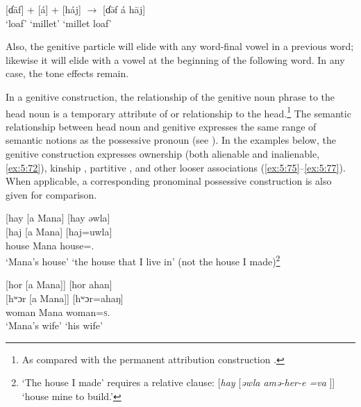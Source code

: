 \ea \label{ex:5:71}
\textup{[ɗ\={a}f]  +  [á]  +  [háj]    $\rightarrow$   [ɗ\={ə}f á h\={a}j]}\\
\glt  ‘loaf’  \hspace{6pt}  {\GEN}  \hspace{1pt}  ‘millet’   \hspace{3pt}    ‘millet loaf’
\z

Also, the genitive particle will elide with any word-final vowel in a previous word; likewise it will elide with a vowel at the beginning of the following word. In any case, the tone effects remain.

\largerpage In a genitive construction, the relationship of the genitive noun phrase to the head  noun is a temporary attribute of or relationship to the head.\footnote{As compared with the permanent attribution construction .} The semantic relationship between head noun and genitive expresses the same range of semantic notions as the possessive pronoun (see ). In the examples below, the genitive construction expresses ownership (both alienable and inalienable, \ref{ex:5:72}), kinship , partitive , and other looser associations (\ref{ex:5:75}--\ref{ex:5:77}). When applicable, a corresponding pronominal possessive construction is also given for comparison. 

\ea \label{ex:5:72}
{}[hay [a  Mana]  \hspace{43pt}  [hay əwla]\\  
\gll {}[haj    [a   Mana]  \hspace{30pt}     [haj=uwla]  \\
house    {\GEN}  Mana   \hspace{30pt}    house={\oneS}.{\POSS}\\
\glt ‘Mana’s house’  \hspace{42pt}       ‘the house that I live in’ (not the house I  made)\footnote{‘The house I made’ requires a relative clause: [\textit{hay} [\textit{əwla      amə-her-e  =va }]] ‘house mine to build.’}
\z


\ea \label{ex:5:73}
{}[hor  [a  Mana]]  \hspace{42pt}     [hor  ahan]\\
\gll  {}[hʷɔr   [a   Mana]]  \hspace{20pt}     [hʷɔr=ahaŋ]\\
      woman    {\GEN}    Mana   \hspace{20pt}    woman=\textsc{s}.{\POSS}\\
\glt  ‘Mana’s wife’   \hspace{50pt}      ‘his wife’
\z

